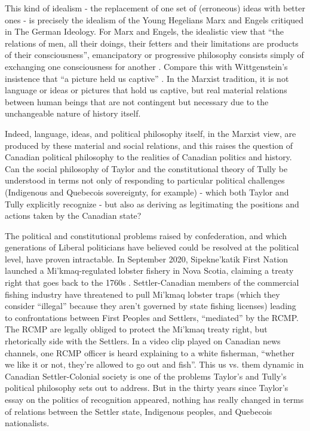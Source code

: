 \documentclass[12pt,oneside]{memoir}
\begin{document}
This kind of idealism - the replacement of one set of (erroneous) ideas with better ones - is precisely the idealism of the Young Hegelians Marx and Engels critiqued in The German Ideology. For Marx and Engels, the idealistic view that “the relations of men, all their doings, their fetters and their limitations are products of their consciousness”, emancipatory or progressive philosophy consists simply of exchanging one consciousness for another \citep[36]{MarxEngels1976}. Compare this with Wittgenstein’s insistence that “a picture held us captive” \citep[53]{Wittgenstein2009}. In the Marxist tradition, it is not language or ideas or pictures that hold us captive, but real material relations between human beings that are not contingent but necessary due to the unchangeable nature of history itself.

Indeed, language, ideas, and political philosophy itself, in the Marxist view, are produced by these material and social relations, and this raises the question of Canadian political philosophy to the realities of Canadian politics and history. Can the social philosophy of Taylor and the constitutional theory of Tully be understood in terms not only of responding to particular political challenges (Indigenous and Quebecois sovereignty, for example) - which both Taylor and Tully explicitly recognize - but also as deriving as legitimating the positions and actions taken by the Canadian state?

The political and constitutional problems raised by confederation, and which generations of Liberal politicians have believed could be resolved at the political level, have proven intractable. In September 2020, Sipekne'katik First Nation launched a Mi’kmaq-regulated lobster fishery in Nova Scotia, claiming a treaty right that goes back to the 1760s \citep{Palmater2020}. Settler-Canadian members of the commercial fishing industry have threatened to pull Mi’kmaq lobster traps (which they consider “illegal” because they aren’t governed by state fishing licenses) leading to confrontations between First Peoples and Settlers, “mediated” by the RCMP. The RCMP are legally obliged to protect the Mi’kmaq treaty right, but rhetorically side with the Settlers. In a video clip played on Canadian news channels, one RCMP officer is heard explaining to a white fisherman, “whether we like it or not, they’re allowed to go out and fish”. This us vs. them dynamic in Canadian Settler-Colonial society is one of the problems Taylor’s and Tully’s political philosophy sets out to address. But in the thirty years since Taylor’s essay on the politics of recognition appeared, nothing has really changed in terms of relations between the Settler state, Indigenous peoples, and Quebecois nationalists.
\end{document}
